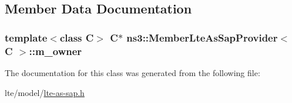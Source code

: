 \subsection{Member Data Documentation}
\subsubsection[{\texorpdfstring{m\+\_\+owner}{m_owner}}]{\setlength{\rightskip}{0pt plus 5cm}template$<$class C$>$ {\bf C}$\ast$ {\bf ns3\+::\+Member\+Lte\+As\+Sap\+Provider}$<$ {\bf C} $>$\+::m\+\_\+owner\hspace{0.3cm}{\ttfamily [private]}}\hypertarget{classns3_1_1MemberLteAsSapProvider_a96ffeef62638df36c2fbaa3fb9fabb57}{}\label{classns3_1_1MemberLteAsSapProvider_a96ffeef62638df36c2fbaa3fb9fabb57}


The documentation for this class was generated from the following file\+:\begin{DoxyCompactItemize}
\item 
lte/model/\hyperlink{lte-as-sap_8h}{lte-\/as-\/sap.\+h}\end{DoxyCompactItemize}
